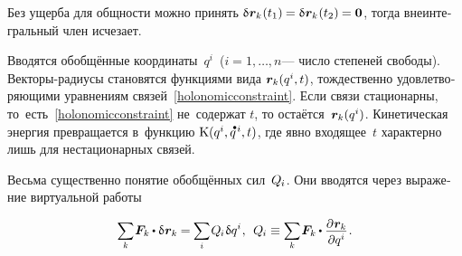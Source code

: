 \begin{otherlanguage}{russian}
\vspace{-0.16em}\noindent
Без ущерба для общности можно принять ${\variation{\hspace{.1ex}\locationvector_k}\hspace{.1ex}(t_1) \hspace{-0.1ex} = \variation{\hspace{.1ex}\locationvector_k}\hspace{.1ex}(t_2) \hspace{-0.1ex} = \bm{0}}$, тогда внеинтегральный член исчезает.

Вводятся обобщённые координаты~$q^i$~(${i = 1, \ldots, n}$\:--- число степеней свободы).
Векторы-радиусы становятся функциями \hbox{вида} ${\bm{r}_{k}(q^i, t)}$, тождественно удовлетворяющими уравнениям связей~\eqref{holonomicconstraint}.
Если связи стационарны, то~есть~\eqref{holonomicconstraint} не~содержат $t$, то остаётся~${\bm{r}_{k}(q^i)}$.
Кинетическая энергия превращается в~функцию ${\kinetic \hspace{.1ex} (q^i, \mathdotabove{q}^{\hspace{.2ex}i}, t)}$, где явно входящее~$t$ характерно лишь для нестационарных связей.

Весьма существенно понятие обобщённых сил~${Q_{\hspace{-0.1ex}i}}$.
Они вводятся через выражение виртуальной работы

\nopagebreak\vspace{-0.25em}\begin{equation}
\scalebox{0.92}[0.96]{$ \displaystyle \sum_{\smash{k}} $} \hspace{.16ex}
\bm{F}_k \hspace{-0.1ex} \dotp \variation{\hspace{.1ex}\locationvector_k} \hspace{-0.1ex}
= \hspace{-0.1ex} \scalebox{0.92}[0.96]{$\displaystyle \sum_{i}$} \hspace{.16ex} Q_{\hspace{-0.1ex}i} \hspace{.12ex} \variation{q^i} \hspace{.1ex} ,
\:\:
Q_{\hspace{-0.1ex}i} \equiv
\scalebox{0.92}[0.96]{$ \displaystyle \sum_{\smash{k}} $} \hspace{.16ex}
\bm{F}_k \hspace{-0.1ex} \dotp \scalebox{0.96}{$ \displaystyle \frac{\raisemath{-0.12em}{\partial \hspace{.1ex} \locationvector_k}}{\raisemath{-0.1em}{\partial q^i}} $} \hspace{.16ex} .
\vspace{-0.1em}\end{equation}


\end{otherlanguage}
